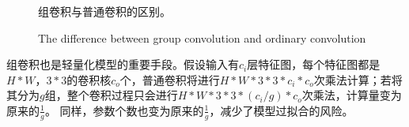 \documentclass[10pt,UTF8,fntef]{ctexart}
\begin{document}
\begin{multicols}{2}
\begin{figure}[H]
    \centering
        \caption[]{组卷积与普通卷积的区别。}
        \addtocounter{figure}{-1}
        \vspace{-5pt}
        \renewcommand{\figurename}{Fig}
        \caption{The difference between group convolution and ordinary convolution}
        \renewcommand{\figurename}{图}
        \label{pic:GC}
\end{figure}

组卷积也是轻量化模型的重要手段。假设输入有$c_i$层特征图，每个特征图都是$H*W$，$3*3$的卷积核$c_o$个，普通卷积将进行$H*W*3*3*c_i*c_o$次乘法计算；若将其分为$g$组，整个卷积过程只会进行$H*W*3*3*(c_i/g)*c_o$次乘法，计算量变为原来的$\frac{1}{g}$。
同样，参数个数也变为原来的$\frac{1}{g}$，减少了模型过拟合的风险。


\end{multicols}
\end{document}
